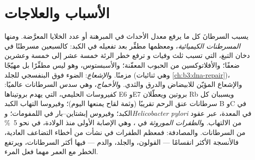 \section{الأسباب والعلاجات}

\begin{proposition}[الأسباب]\label{prop:b3:cancer-biology:causes}
يسبب السرطانَ كل ما يرفع معدل الأحداث في
المبرهنة أو عدد الخلايا المعرَّضة. ومنها \emph{المسرطنات الكيميائية}،
ومعظمها مطفِّر بعد تفعيله في الكبد: كالسبعين
مسرطنًا في دخان التبغ، التي تسبب ثلث وفيات  و
ترفع خطر  الرئة خمسة عشر إلى خمسة وعشرين ضعفًا؛ والأفلاتوكسين
من الحبوب المعفّنة؛ والأسبستوس، وهو ليس مطفِّرًا بل مهيّجًا
مزمنًا. و\emph{الإشعاع}: الضوء فوق البنفسجي للجلد (وهي ثنائيات
\cref{ch:b3:dna-repair})، والإشعاع المؤيّن للابيضاض والدرق
والثدي. و\emph{الأخماج}، وهي سدس السرطانات عالميًا: كفيروسات
 الحليمي، التي يهدم بروتيناها E6 وE7 بروتين  ويعطّلان
Rb ويسببان كل سرطانات عنق الرحم تقريبًا (وثمة لقاح يمنعها اليوم)؛
وفيروسا التهاب الكبد B وC في  الكبد؛ وفيروس إبشتاين--بار في
اللمفومات؛ و\emph{Helicobacter pylori} في  المعدة، عبر عقود
من الالتهاب. و\emph{الطفرات الموروثة} في ، وهي
الإصابة الأولى منذ الولادة، في نحو \qty{5}{\%} من السرطانات. والمصادفة: فمعظم
الطفرات في  نشأت من أخطاء التضاعف العادية،
فالأنسجة الأكثر انقسامًا --- القولون، والجلد، والدم ---
فيها أكثر السرطانات، ويرتفع الخطر مع العمر مهما فعل المرء.
\end{proposition}

